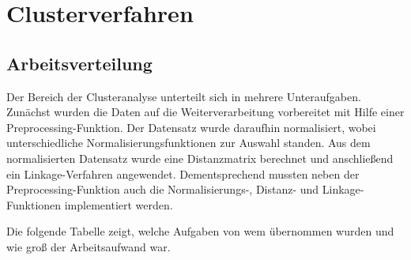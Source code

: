 \documentclass[12pt]{article}
\begin{document}
\section{Clusterverfahren}

\subsection{Arbeitsverteilung}
\label{cluster-arbeitsverteilung}
Der Bereich der Clusteranalyse unterteilt sich in mehrere Unteraufgaben. Zunächst wurden die Daten auf die Weiterverarbeitung vorbereitet mit Hilfe einer Preprocessing-Funktion. Der Datensatz wurde daraufhin normalisiert, wobei unterschiedliche Normalisierungsfunktionen zur Auswahl standen. Aus dem normalisierten Datensatz wurde eine Distanzmatrix berechnet und anschließend ein Linkage-Verfahren angewendet. Dementsprechend mussten neben der Preprocessing-Funktion auch die Normalisierungs-, Distanz- und Linkage-Funktionen implementiert werden. 

Die folgende Tabelle zeigt, welche Aufgaben von wem übernommen wurden und wie groß der Arbeitsaufwand war.
\end{document}
